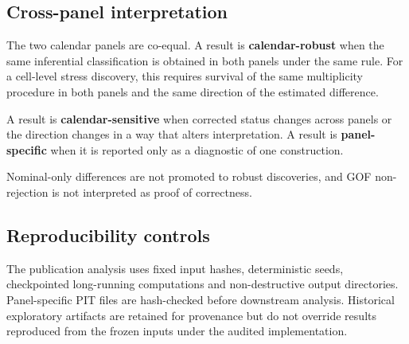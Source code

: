 \subsection{Cross-panel interpretation}

The two calendar panels are co-equal. A result is \textbf{calendar-robust} when the same inferential classification is obtained in both panels under the same rule. For a cell-level stress discovery, this requires survival of the same multiplicity procedure in both panels and the same direction of the estimated difference.

A result is \textbf{calendar-sensitive} when corrected status changes across panels or the direction changes in a way that alters interpretation. A result is \textbf{panel-specific} when it is reported only as a diagnostic of one construction.

Nominal-only differences are not promoted to robust discoveries, and GOF non-rejection is not interpreted as proof of correctness.

\subsection{Reproducibility controls}

The publication analysis uses fixed input hashes, deterministic seeds, checkpointed long-running computations and non-destructive output directories. Panel-specific PIT files are hash-checked before downstream analysis. Historical exploratory artifacts are retained for provenance but do not override results reproduced from the frozen inputs under the audited implementation.
